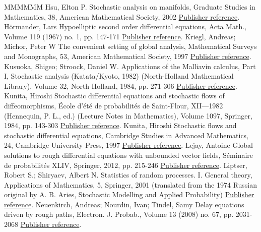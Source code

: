 \begin{thebibliography}{MMMMMM}
 Hsu, Elton P. Stochastic analysis on manifolds, Graduate Studies in Mathematics, 38, American Mathematical Society, 2002 \href{https://ahl.centre-mersenne.org/item/AHL_2020__3__1023_0/#Hsu}{Publisher reference}.
 Hörmander, Lars Hypoelliptic second order differential equations, Acta Math., Volume 119 (1967) no. 1, pp. 147-171 \href{https://ahl.centre-mersenne.org/item/AHL_2020__3__1023_0/#hormander1967}{Publisher reference}.
 Kriegl, Andreas; Michor, Peter W The convenient setting of global analysis, Mathematical Surveys and Monographs, 53, American Mathematical Society, 1997 \href{https://ahl.centre-mersenne.org/item/AHL_2020__3__1023_0/#kriegl-michor1997}{Publisher reference}.
 Kusuoka, Shigeo; Stroock, Daniel W. Applications of the Malliavin calculus, Part I, Stochastic analysis (Katata/Kyoto, 1982) (North-Holland Mathematical Library), Volume 32, North-Holland, 1984, pp. 271-306 \href{https://ahl.centre-mersenne.org/item/AHL_2020__3__1023_0/#KS1984}{Publisher reference}.
 Kunita, Hiroshi Stochastic differential equations and stochastic flows of diffeomorphisms, École d’été de probabilités de Saint-Flour, XII—1982 (Hennequin, P. L., ed.) (Lecture Notes in Mathematics), Volume 1097, Springer, 1984, pp. 143-303 \href{https://ahl.centre-mersenne.org/item/AHL_2020__3__1023_0/#K84}{Publisher reference}.
 Kunita, Hiroshi Stochastic flows and stochastic differential equations, Cambridge Studies in Advanced Mathematics, 24, Cambridge University Press, 1997 \href{https://ahl.centre-mersenne.org/item/AHL_2020__3__1023_0/#kunita1997}{Publisher reference}.
 Lejay, Antoine Global solutions to rough differential equations with unbounded vector fields, Séminaire de probabilités XLIV, Springer, 2012, pp. 215-246 \href{https://ahl.centre-mersenne.org/item/AHL_2020__3__1023_0/#lejay2012global}{Publisher reference}.
 Liptser, Robert S.; Shiryaev, Albert N. Statistics of random processes. I. General theory, Applications of Mathematics, 5, Springer, 2001 (translated from the 1974 Russian original by A. B. Aries, Stochastic Modelling and Applied Probability) \href{https://ahl.centre-mersenne.org/item/AHL_2020__3__1023_0/#LiShi2001}{Publisher reference}.
 Neuenkirch, Andreas; Nourdin, Ivan; Tindel, Samy Delay equations driven by rough paths, Electron. J. Probab., Volume 13 (2008) no. 67, pp. 2031-2068 \href{https://ahl.centre-mersenne.org/item/AHL_2020__3__1023_0/#nnt2008}{Publisher reference}.

\end{thebibliography}
